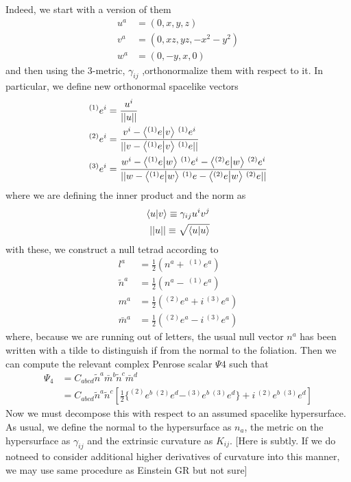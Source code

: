 \documentclass[a4paper,oneside,openany,11pt]{memoir}
\numberwithin{equation}{section} %
\newcommand{\NOTE}[1]{{\color{blue}[#1]}}
\begin{document}
Indeed, we start with a version of them
\begin{align}
u^a &= (0,x,y,z) \\
v^a &= (0,xz,yz,-x^2 - y^2) \\
w^a &= (0,-y,x,0)
\end{align}
and then using the 3-metric, $\gamma_{ij}$ ,orthonormalize them with respect to it. In particular, we define new orthonormal spacelike vectors
\begin{align}
^{(1)}e^i &= \frac{u^i}{||u||} \\
^{(2)}e^i &= \frac{v^i -  \bra{ ^{(1)}e}\ket{v} \, ^{(1)}e^i}{||v -  \bra{ ^{(1)}e}\ket{v} \, ^{(1)}e ||} \\
^{(3)}e^i &= \frac{w^i -  \bra{ ^{(1)}e}\ket{w} \, ^{(1)}e^i -  \bra{ ^{(2)}e}\ket{w} \, ^{(2)}e^i}{||w -  \bra{ ^{(1)}e}\ket{w} \, ^{(1)}e - \bra{ ^{(2)}e}\ket{w} \, ^{(2)}e ||} 
\end{align}
where we are defining the inner product and the norm as
\begin{align}
\bra{u}\ket{v} \equiv \gamma_{ij} u^i v^j \\
|| u || \equiv \sqrt{\bra{u}\ket{u}}
\end{align}
with these, we construct a null tetrad according to
\begin{align}
l^a &= \frac{1}{2} (n^a + \, ^{(1)}e^a) \\
\widetilde{n}^a &= \frac{1}{2} (n^a - \, ^{(1)}e^a) \\
m^a &= \frac{1}{2} (^{(2)}e^a + i \, ^{(3)}e^a) \\
\bar{m}^a &=  \frac{1}{2} (^{(2)}e^a - i \, ^{(3)}e^a)
\end{align}
where, because we are running out of letters, the usual null vector $n^a$ has been written with a tilde to distinguish if from the normal 
to the foliation. Then we can compute the relevant complex Penrose scalar $\Psi4$ such that
\begin{align}
\Psi_4 &= C_{abcd} \widetilde{n}^a \bar{m}^b \widetilde{n}^c \bar{m}^d \\
           &= C_{abcd} \widetilde{n}^a \widetilde{n}^c \left[\frac{1}{2} \{ ^{(2)}e^b \, ^{(2)}e^d - ^{(3)}e^b \, ^{(3)}e^d  \} + i \, ^{(2)}e^b \, ^{(3)}e^d \right] 
\end{align}
Now we must decompose this with respect to an assumed spacelike hypersurface. As usual, 
we define the normal to the hypersurface as $n_a$, the metric on the hypersurface as $\gamma_{ij}$ 
and the extrinsic curvature as $K_{ij}$.
\NOTE{Here is subtly. If we do notneed to consider additional higher derivatives of curvature into this manner, we may use same procedure as Einstein GR but not sure}



	
\end{document}
